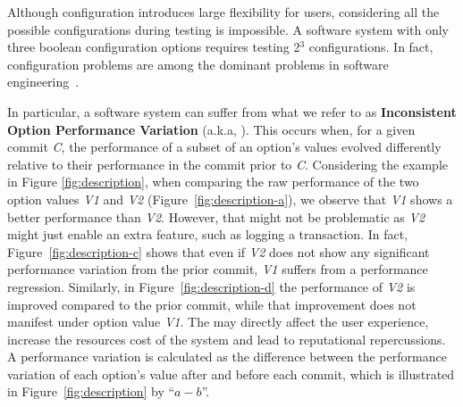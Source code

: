 Although configuration introduces large flexibility for users, considering all the possible configurations during testing is impossible. A software system with only three boolean configuration options requires testing 2${^3}$ configurations. In fact, configuration problems are among the dominant %
problems in software engineering~\cite{tse,RN2897}.

In particular, a software system can suffer from what we refer to as \textbf{Inconsistent Option Performance Variation} (a.k.a, \inconsistent). This occurs when, for a given commit \emph{C}, the performance of a subset of an option's values evolved differently relative to their performance in the commit prior to \emph{C}. Considering the example in Figure \ref{fig:description}, when comparing the raw performance of the two option values \emph{V1} and \emph{V2} (Figure~\ref{fig:description-a}), we observe that \emph{V1} shows a better performance than \emph{V2}. However, that might not be problematic as \emph{V2} might just enable an extra feature, such as logging a transaction. In fact, Figure~\ref{fig:description-c} shows that even if \emph{V2} does not show any significant performance variation from the prior commit, \emph{V1} suffers from a performance regression.  
Similarly, in Figure~\ref{fig:description-d} the performance of \emph{V2} is improved compared to the prior commit, while that improvement does not manifest under option value \emph{V1}. The \inconsistent may directly affect the user experience, increase the resources cost of the system and lead to reputational repercussions. %
A performance variation is calculated as the difference between the performance variation of each option's value after and before each commit, which is illustrated in Figure~\ref{fig:description} by ``$a - b$''.


